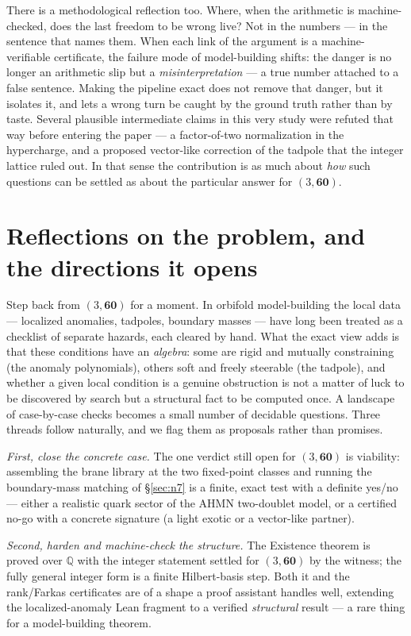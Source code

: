 \documentclass[11pt,a4paper]{article}
\begin{document}
There is a methodological reflection too. Where, when the arithmetic is machine-checked,
does the last freedom to be wrong live? Not in the numbers --- in the sentence that names
them. When each link of the argument is a
machine-verifiable certificate, the failure mode of model-building shifts: the danger is
no longer an arithmetic slip but a \emph{misinterpretation} --- a true number attached to
a false sentence. Making the pipeline exact does not remove that danger, but it isolates
it, and lets a wrong turn be caught by the ground truth rather than by taste. Several
plausible intermediate claims in this very study were refuted that way before entering
the paper --- a factor-of-two normalization in the hypercharge, and a proposed
vector-like correction of the tadpole that the integer lattice ruled out. In that sense the contribution is as much about \emph{how} such
questions can be settled as about the particular answer for $(3,\mathbf{60})$.

\section{Reflections on the problem, and the directions it opens}\label{sec:outlook}
Step back from $(3,\mathbf{60})$ for a moment. In orbifold model-building the local data ---
localized anomalies, tadpoles, boundary masses --- have long been treated as a checklist of
separate hazards, each cleared by hand. What the exact view adds is that these conditions
have an \emph{algebra}: some are rigid and mutually constraining (the anomaly polynomials),
others soft and freely steerable (the tadpole), and whether a given local condition is a
genuine obstruction is not a matter of luck to be discovered by search but a structural fact
to be computed once. A landscape of case-by-case checks becomes a small number of decidable
questions. Three threads follow naturally, and we flag them as proposals rather than
promises.

\emph{First, close the concrete case.} The one verdict still open for $(3,\mathbf{60})$ is
viability: assembling the brane library at the two fixed-point classes and running the
boundary-mass matching of \S\ref{sec:n7} is a finite, exact test with a definite yes/no ---
either a realistic quark sector of the AHMN two-doublet model, or a certified no-go with a
concrete signature (a light exotic or a vector-like partner).

\emph{Second, harden and machine-check the structure.} The Existence theorem is proved over
$\mathbb{Q}$ with the integer statement settled for $(3,\mathbf{60})$ by the witness; the
fully general integer form is a finite Hilbert-basis step. Both it and the rank/Farkas
certificates are of a shape a proof assistant handles well, extending the localized-anomaly
Lean fragment to a verified \emph{structural} result --- a rare thing for a model-building
theorem.
\end{document}
